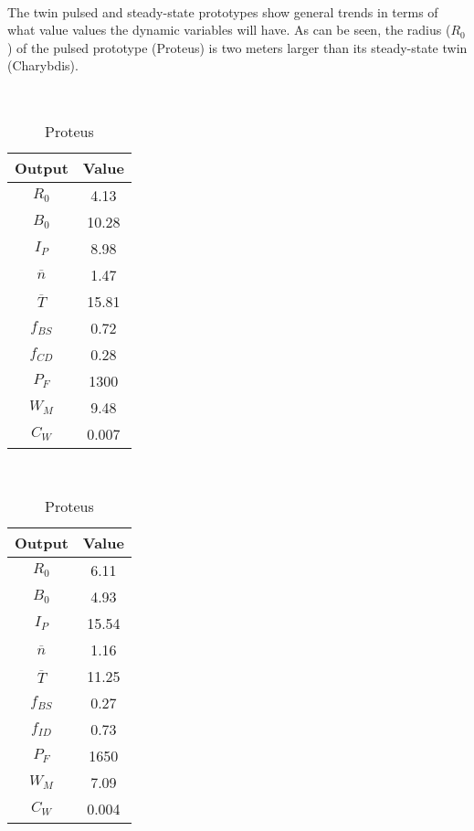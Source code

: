 \begin{table}[b!]
\centering
\caption{Proteus and Charybdis Comparison} ~ \\
\small{ The twin pulsed and steady-state prototypes show general trends in terms of what value values the dynamic variables will have. As can be seen, the radius ($R_0$) of the pulsed prototype (Proteus) is two meters larger than its steady-state twin (Charybdis). }
\hfill
\begin{subtable}[t]{0.45\textwidth}
\centering
\caption{Charybdis} ~\\
\begin{tabular}{ c|c }

Output           & Value       \\
\hline
$R_{0}$          & 4.13            \\
$B_{0}$          & 10.28            \\
$I_{P}$          & 8.98            \\
$\overline n$    & 1.47            \\
$\overline T$    & 15.81           \\
$f_{BS}$ & 0.72 \\
$f_{CD}$ & 0.28 \\
$P_F$ & 1300 \\
$W_M$ & 9.48 \\
$C_W$ & 0.007 \\
\end{tabular}
\end{subtable}
\hfill
\begin{subtable}[t]{0.45\textwidth}
\centering
\caption{Proteus} ~\\
\begin{tabular}{ c|c }

Output           & Value       \\
\hline
$R_{0}$          & 6.11             \\
$B_{0}$          & 4.93            \\
$I_{P}$          & 15.54            \\
$\overline n$    & 1.16            \\
$\overline T$    & 11.25            \\
$f_{BS}$ & 0.27 \\
$f_{ID}$ & 0.73 \\
$P_F$ & 1650 \\
$W_M$ & 7.09 \\
$C_W$ & 0.004 \\
\end{tabular}
\end{subtable}
\hfill
\hfill
\label{table:proteus_charybdis} ~ \\ ~ \\ ~ \\  ~ \\
\end{table}

